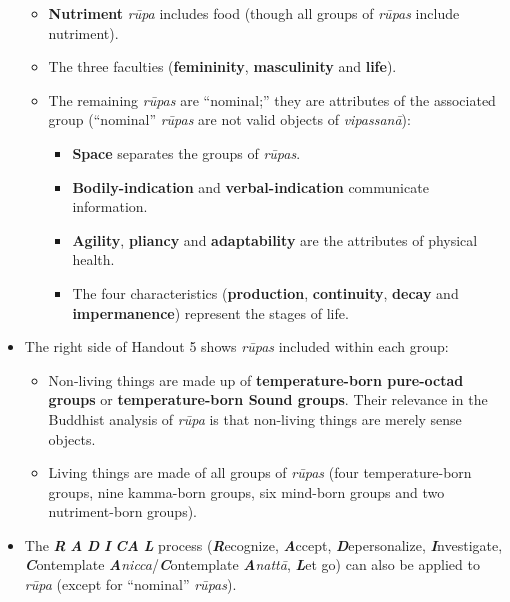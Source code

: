 \begin{itemize}
\begin{itemize}
\item \textbf{Nutriment} \textit{rūpa} includes food (though all groups of \textit{rūpas} include nutriment).

\item The three faculties (\textbf{femininity}, \textbf{masculinity} and \textbf{life}).

\item The remaining \textit{rūpas} are “nominal;” they are attributes of the associated group (“nominal” \textit{rūpas} are not valid objects of \textit{vipassanā}):

\begin{itemize}

\item \textbf{Space} separates the groups of \textit{rūpas}.

\item \textbf{Bodily-indication} and \textbf{verbal-indication} communicate information.

\item \textbf{Agility}, \textbf{pliancy} and \textbf{adaptability} are the attributes of physical health.

\item The four characteristics (\textbf{production}, \textbf{continuity}, \textbf{decay} and \textbf{impermanence}) represent the stages of life.

\end{itemize}

\end{itemize}

\item The right side of Handout 5 shows \textit{rūpas} included within each group:

\begin{itemize}

\item Non-living things are made up of \textbf{temperature-born pure-octad groups} or \textbf{temperature-born \textbf{Sound} groups}. Their relevance in the Buddhist analysis of \textit{rūpa} is that non-living things are merely sense objects.

\item Living things are made of all groups of \textit{rūpas} (four temperature-born groups, nine kamma-born groups, six mind-born groups and two nutriment-born groups).

\end{itemize}

\item The \textbf{\textit{R}} \textbf{\textit{A}} \textbf{\textit{D}} \textbf{\textit{I}} \textbf{\textit{CA}} \textbf{\textit{L}} process (\textbf{\textit{R}}ecognize, \textbf{\textit{A}}ccept, \textbf{\textit{D}}epersonalize, \textbf{\textit{I}}nvestigate, \textbf{\textit{C}}ontemplate \textbf{\textit{A}}\textit{nicca}/\textbf{\textit{C}}ontemplate \textbf{\textit{A}}\textit{nattā}, \textbf{\textit{L}}et go) can also be applied to \textit{rūpa} (except for “nominal” \textit{rūpas}).

\end{itemize}


